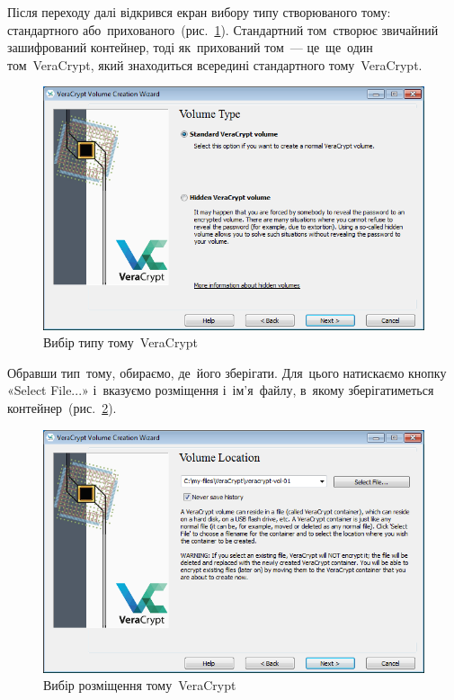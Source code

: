 \documentclass[
	a4paper,
	oneside,
	BCOR = 10mm,
	DIV = 12,
	12pt,
	headings = normal,
]{scrartcl}
\begin{document}
		Після переходу далі відкрився екран вибору типу створюваного тому: стандартного або~прихованого~(рис.~\ref{fig:vc-volcr-wizard-vol-type}). Стандартний том~створює звичайний зашифрований контейнер, тоді як~прихований том~— це~ще~один том~\textenglish{VeraCrypt}, який знаходиться всередині стандартного тому~\textenglish{VeraCrypt}.

		\begin{figure}[!htbp]
			\centering
			\includegraphics[height = 10 \baselineskip]{./assets/03.png}
			\caption{Вибір типу тому~\textenglish{VeraCrypt}}
			\label{fig:vc-volcr-wizard-vol-type}
		\end{figure}

		Обравши тип~тому, обираємо, де~його зберігати. Для~цього натискаємо кнопку «\textenglish{Select File...}» і~вказуємо розміщення і~ім'я~файлу, в~якому зберігатиметься контейнер~(рис.~\ref{fig:vc-volume-path}).

		\begin{figure}[!htbp]
			\centering
			\includegraphics[height = 10 \baselineskip]{./assets/04.png}
			\caption{Вибір розміщення тому~\textenglish{VeraCrypt}}
			\label{fig:vc-volume-path}
		\end{figure}
\end{document}
